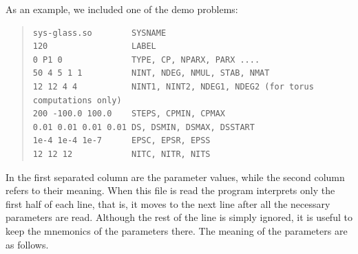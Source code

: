 \documentclass[10pt,a4paper]{ddedoc}
\begin{document}
As an example, we included one of the demo problems:
{ \small \begin{quote} \begin{lstlisting}[basicstyle=\tt,frame=single]
sys-glass.so        SYSNAME
120                 LABEL
0 P1 0              TYPE, CP, NPARX, PARX ....
50 4 5 1 1          NINT, NDEG, NMUL, STAB, NMAT
12 12 4 4           NINT1, NINT2, NDEG1, NDEG2 (for torus computations only)
200 -100.0 100.0    STEPS, CPMIN, CPMAX
0.01 0.01 0.01 0.01 DS, DSMIN, DSMAX, DSSTART
1e-4 1e-4 1e-7      EPSC, EPSR, EPSS
12 12 12            NITC, NITR, NITS
\end{lstlisting} \end{quote} } \noindent
In the first separated column are the parameter values, while the second column refers to their meaning. 
When this file is read the program interprets only the first half of each line, that is, it moves to the next line
after all the necessary parameters are read. Although the rest of the line is simply ignored, 
it is useful to keep the mnemonics of the parameters there. The meaning of the parameters are as
follows.
\end{document}
